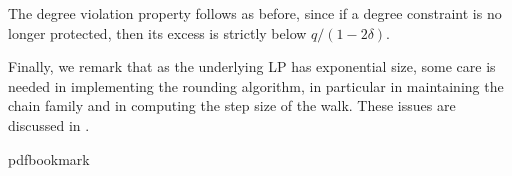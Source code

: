 \documentclass[11pt]{article}
\theoremstyle{definition}
\begin{document}
The degree violation property follows as before, since if a degree constraint is no longer protected, then its excess is strictly below $q/(1-2\delta)$. 
%
%

Finally, we remark that as the underlying LP has exponential size, some care is needed in implementing the rounding algorithm, in particular in maintaining the chain family and in computing the step size of the walk. These issues are discussed in \cite{BN16}.



%
%
%
%

%
%
%
%
%
%
%
%
%
%
%
%
%
%
%
%
%

%
%
%
%
%
%

%
%
%
%
%
%
%
%


%
%
%

%
%
%
%

%
%
%
%
%
%
%
%
%
%

%
%
%
%
%

%

%
%
%
%
%
%
%

%
%
%
%
%
%

%
%
%
%
%
%
%
%
%
%

%
%
%
%
%
%

%
%
%
%
%
%
%
%

%
%
%
%
%




\newcommand{\prelim}{Preliminary version in\ }\newcommand{\prelims}{Preliminary
  versions in\ }
\providecommand{\bibhead}[1]{}
\expandafter\ifx\csname pdfbookmark\endcsname\relax%
  \providecommand{\tocrefpdfbookmark}{}
\else\providecommand{\tocrefpdfbookmark}{%
   \hypertarget{tocreferences}{}%
   \pdfbookmark[1]{References}{tocreferences}}%
\fi
\end{document}
